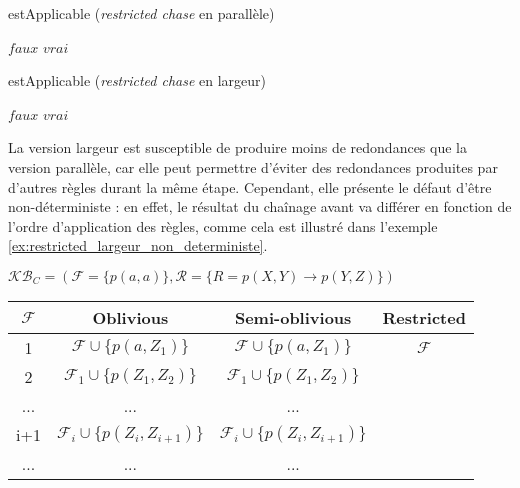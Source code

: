 \begin{algorithm}[!h]\label{algo:est_applicable_restricted_parallel}
\caption{estApplicable (\textit{restricted chase} en parallèle)}
\SetAlgoLined
\DontPrintSemicolon
{}
    {
        \Return $faux$
    }
\Return $vrai$
\end{algorithm}
\begin{algorithm}[H]\label{algo:est_applicable_restricted_largeur}
\caption{estApplicable (\textit{restricted chase} en largeur)}
\SetAlgoLined
\DontPrintSemicolon
{}
    {
        \Return $faux$
    }
\Return $vrai$
\end{algorithm}
\par La version largeur est susceptible de produire moins de redondances que la version parallèle, car elle peut permettre d'éviter des redondances produites par d'autres règles durant la même étape. Cependant, elle présente le défaut d'être non-déterministe : en effet, le résultat du chaînage avant va différer en fonction de l'ordre d'application des règles, comme cela est illustré dans l'exemple \ref{ex:restricted_largeur_non_deterministe}.

\begin{example}
$\mathcal{KB}_C = (\mathcal{F} = \{p(a,a)\}, \mathcal{R} = \{R = p(X,Y) \rightarrow p(Y,Z) \})$

\begin{center}
\begin{tabular}{|c|c|c|c|}
    \hline
    $\mathcal{F}$ & Oblivious & Semi-oblivious & Restricted \\ 
    \hline
    1 &$\mathcal{F} \cup \{p(a, Z_1)\}$ & $\mathcal{F} \cup \{p(a, Z_1)\} $&  $\mathcal{F}$ \\ 
    \hline
    2 &$\mathcal{F}_1 \cup \{p(Z_1, Z_2)\}$ &$\mathcal{F}_1 \cup \{p(Z_1, Z_2)\}$ & \\
    \hline
    ... & ... & ... & \\
    \hline
    i+1 & $\mathcal{F}_i \cup \{p(Z_{i}, Z_{i+1})\} $& $\mathcal{F}_i \cup \{p(Z_{i}, Z_{i+1})\} $&   \\
     \hline
     ... & ... & ... & \\
     \hline
\end{tabular}
\end{center}
\end{example}

